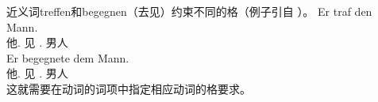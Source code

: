 \begin{exe}
\begin{xlist}[iv.]
\begin{exe}
\begin{xlist}[iv.]
\zl
近义词treffen和begegnen（去见）约束不同的格（例子引自 \citet[]{ps}）。
\eal
\ex 
\gll Er traf den Mann.\\
     他.\nom{} 见 .\acc{} 男人\\
\ex 
\gll Er begegnete dem Mann.\\
     他.\nom{} 见 .\dat{} 男人\\
\zl
这就需要在动词的词项中指定相应动词的格要求。
%


\end{xlist}
\end{exe}
\end{xlist}
\end{exe}
